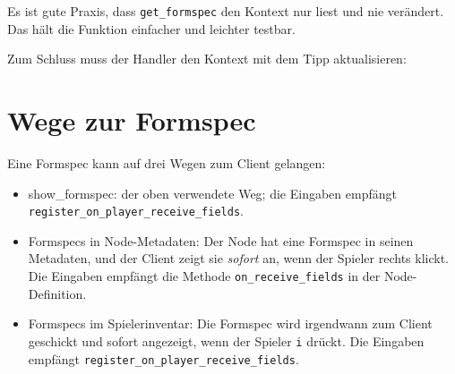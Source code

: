 Es ist gute Praxis, dass \texttt{get\_\allowbreak{}formspec} den Kontext
nur liest und nie verändert. Das hält die Funktion einfacher und
leichter testbar.

Zum Schluss muss der Handler den Kontext mit dem Tipp aktualisieren:

\begin{Shaded}
\begin{Highlighting}[]
  
      \OperatorTok{=} \OperatorTok{:}\OperatorTok{()}
      \OperatorTok{=}\OperatorTok{(}\OperatorTok{)}
     \OperatorTok{=} \OperatorTok{(}\OperatorTok{)}
    \OperatorTok{(}\OperatorTok{)}
\end{Highlighting}
\end{Shaded}

\section{Wege zur Formspec}\label{wege-zur-formspec}

Eine Formspec kann auf drei Wegen zum Client gelangen:

\begin{itemize}
\tightlist
\item
  show\_formspec: der oben verwendete Weg; die Eingaben empfängt
  \texttt{register\_\allowbreak{}on\_\allowbreak{}player\_\allowbreak{}receive\_\allowbreak{}fields}.
\item
  Formspecs in Node-Metadaten: Der Node hat eine Formspec in seinen
  Metadaten, und der Client zeigt sie \emph{sofort} an, wenn der Spieler
  rechts klickt. Die Eingaben empfängt die Methode
  \texttt{on\_\allowbreak{}receive\_\allowbreak{}fields}
  in der Node-Definition.
\item
  Formspecs im Spielerinventar: Die Formspec wird irgendwann zum Client
  geschickt und sofort angezeigt, wenn der Spieler \texttt{i} drückt.
  Die Eingaben empfängt
  \texttt{register\_\allowbreak{}on\_\allowbreak{}player\_\allowbreak{}receive\_\allowbreak{}fields}.
\end{itemize}

